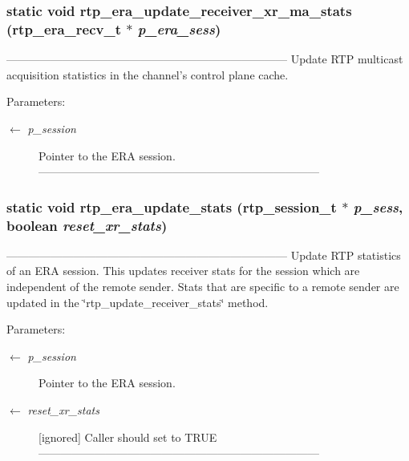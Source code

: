 \subsubsection{\setlength{\rightskip}{0pt plus 5cm}static void rtp\_\-era\_\-update\_\-receiver\_\-xr\_\-ma\_\-stats (\bf{rtp\_\-era\_\-recv\_\-t} $\ast$ {\em p\_\-era\_\-sess})\hspace{0.3cm}{\tt  [static]}}\label{rtp__era__recv_8c_695b621c754e121ca0acb005f8aab6bf}


--------------------------------------------------------------------------- Update RTP multicast acquisition statistics in the channel's control plane cache.

\begin{Desc}
\item[Parameters:]
\begin{description}
\item[\mbox{$\leftarrow$} {\em p\_\-session}]Pointer to the ERA session. --------------------------------------------------------------------------- \end{description}
\end{Desc}
\subsubsection{\setlength{\rightskip}{0pt plus 5cm}static void rtp\_\-era\_\-update\_\-stats (rtp\_\-session\_\-t $\ast$ {\em p\_\-sess}, boolean {\em reset\_\-xr\_\-stats})\hspace{0.3cm}{\tt  [static]}}\label{rtp__era__recv_8c_1b6d5e27f57b6a76122547c2700bc93a}


--------------------------------------------------------------------------- Update RTP statistics of an ERA session. This updates receiver stats for the session which are independent of the remote sender. Stats that are specific to a remote sender are updated in the \char`\"{}rtp\_\-update\_\-receiver\_\-stats\char`\"{} method.

\begin{Desc}
\item[Parameters:]
\begin{description}
\item[\mbox{$\leftarrow$} {\em p\_\-session}]Pointer to the ERA session. \item[\mbox{$\leftarrow$} {\em reset\_\-xr\_\-stats}][ignored] Caller should set to TRUE --------------------------------------------------------------------------- \end{description}
\end{Desc}
